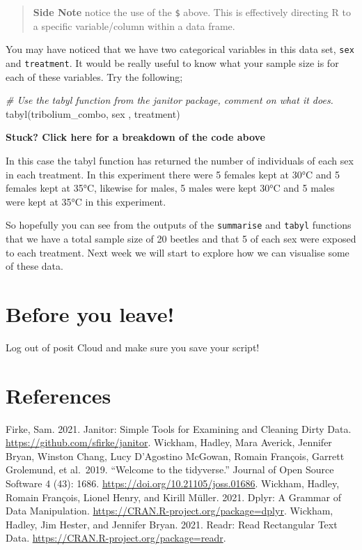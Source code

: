 \documentclass[
]{book}
\newenvironment{Shaded}{\begin{snugshade}}{\end{snugshade}}
\newcommand{\CommentTok}[1]{\textcolor[rgb]{0.56,0.35,0.01}{\textit{#1}}}
\newcommand{\FunctionTok}[1]{\textcolor[rgb]{0.00,0.00,0.00}{#1}}
\newcommand{\NormalTok}[1]{#1}
\begin{document}
\begin{quote}
\textbf{Side Note} notice the use of the \texttt{\$} above. This is effectively directing R to a specific variable/column within a data frame.
\end{quote}

You may have noticed that we have two categorical variables in this data set, \texttt{sex} and \texttt{treatment}. It would be really useful to know what your sample size is for each of these variables. Try the following;

\begin{Shaded}
\begin{Highlighting}[]
\CommentTok{\# Use the tabyl function from the janitor package, comment on what it does. }
\FunctionTok{tabyl}\NormalTok{(tribolium\_combo, sex , treatment)}
\end{Highlighting}
\end{Shaded}

\textbf{Stuck? Click here for a breakdown of the code above}

In this case the tabyl function has returned the number of individuals of each sex in each treatment. In this experiment there were 5 females kept at 30°C and 5 females kept at 35°C, likewise for males, 5 males were kept 30°C and 5 males were kept at 35°C in this experiment.

So hopefully you can see from the outputs of the \texttt{summarise} and \texttt{tabyl} functions that we have a total sample size of 20 beetles and that 5 of each sex were exposed to each treatment. Next week we will start to explore how we can visualise some of these data.

\hypertarget{before-you-leave-1}{%
\section{Before you leave!}\label{before-you-leave-1}}

Log out of posit Cloud and make sure you save your script!

\hypertarget{references-2}{%
\section{References}\label{references-2}}

Firke, Sam. 2021. Janitor: Simple Tools for Examining and Cleaning Dirty Data. \url{https://github.com/sfirke/janitor}.
Wickham, Hadley, Mara Averick, Jennifer Bryan, Winston Chang, Lucy D'Agostino McGowan, Romain François, Garrett Grolemund, et al.~2019. ``Welcome to the tidyverse.'' Journal of Open Source Software 4 (43): 1686. \url{https://doi.org/10.21105/joss.01686}.
Wickham, Hadley, Romain François, Lionel Henry, and Kirill Müller. 2021. Dplyr: A Grammar of Data Manipulation. \url{https://CRAN.R-project.org/package=dplyr}.
Wickham, Hadley, Jim Hester, and Jennifer Bryan. 2021. Readr: Read Rectangular Text Data. \url{https://CRAN.R-project.org/package=readr}.
\end{document}
